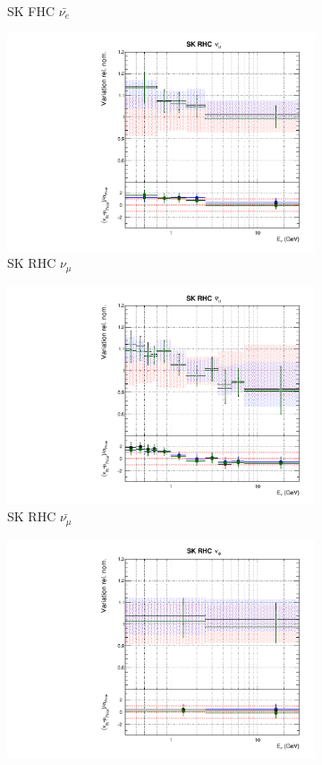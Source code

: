 \begin{figure}
\begin{subfigure}{0.45\textwidth}
  \caption{SK FHC $\bar{\nu_{e}}$}
\end{subfigure}
\begin{subfigure}{0.45\textwidth}
  \centering
  \includegraphics[width=0.75\linewidth]{figs/polydataflux_12}
  \caption{SK RHC $\nu_{\mu}$}
\end{subfigure}
\begin{subfigure}{0.45\textwidth}
  \centering
  \includegraphics[width=0.75\linewidth]{figs/polydataflux_13}
  \caption{SK RHC $\bar{\nu_{\mu}}$}
\end{subfigure}
\begin{subfigure}{0.45\textwidth}
  \centering
  \includegraphics[width=0.75\linewidth]{figs/polydataflux_14}

\end{subfigure}
\end{figure}
